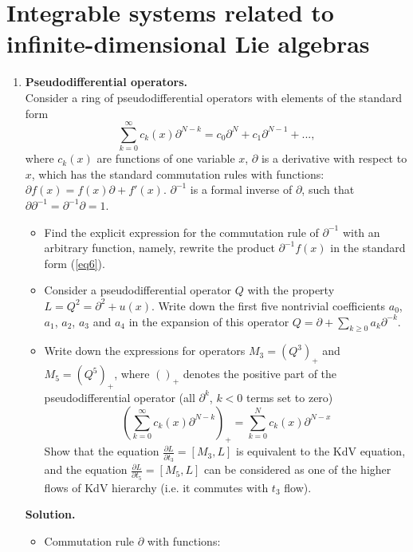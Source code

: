 \documentclass[12pt]{article}
\theoremstyle{definition}
\begin{document}
\section{Integrable systems related to infinite-dimensional Lie algebras}
\begin{enumerate}
    \item \textbf{Pseudodifferential operators.}\\
    Consider a ring of pseudodifferential operators with elements of the standard form
    \begin{equation}\label{eq6}
        \sum\limits_{k=0}^\infty c_k(x)\partial^{N-k}=c_0\partial^N+c_1\partial^{N-1}+...,
    \end{equation}
    where $c_k(x)$ are functions of one variable $x$, $\partial$ is a derivative with respect to $x$, which has the standard commutation rules with functions: $\partial f(x) = f(x)\partial + f'(x)$. $\partial^{-1}$ is a formal inverse of $\partial$, such that $\partial\partial^{-1}=\partial^{-1}\partial=1$.
    \begin{itemize}
        \item Find the explicit expression for the commutation rule of $\partial^{-1}$ with an arbitrary function, namely, rewrite the product $\partial^{-1}f(x)$ in the standard form (\ref{eq6}).
        \item Consider a pseudodifferential operator $Q$ with the property $L = Q^2 =\partial^2+u(x)$. Write down the first five nontrivial coefficients $a_0$, $a_1$, $a_2$, $a_3$ and $a_4$ in the expansion of this operator $Q=\partial+\sum\limits_{k\geq0}a_k\partial^{-k}$.
        \item Write down the expressions for operators $M_3 = (Q^3)_+$ and $M_5 = (Q^5)_+$, where $()_+$ denotes the positive part of the pseudodifferential operator (all $\partial^k$, $k<0$ terms set to zero)
        \begin{equation}
            \left(\sum\limits_{k=0}^\infty c_k(x)\partial^{N-k}\right)_+=\sum\limits_{k=0}^Nc_k(x)\partial^{N-x}
        \end{equation}
        Show that the equation $\frac{\partial L}{\partial t_3} = [M_3, L]$ is equivalent to the KdV equation, and the equation $\frac{\partial L}{\partial t_5} = [M_5, L]$ can be considered as one of the higher flows of KdV hierarchy (i.e. it commutes with $t_3$ flow).
    \end{itemize}
    \textbf{Solution.}
    \begin{itemize}
        \item Commutation rule $\partial$ with functions:

\end{itemize}
\end{enumerate}
\end{document}
